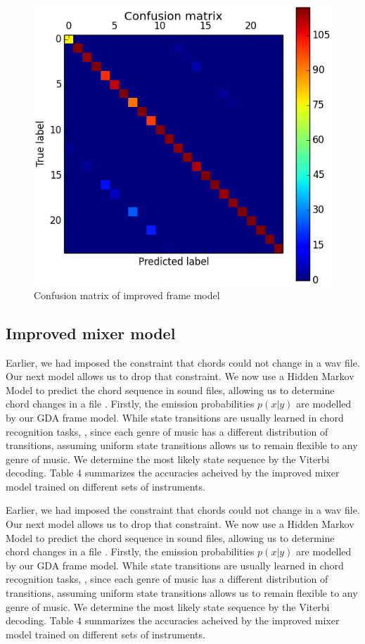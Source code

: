 \documentclass{article}
\begin{document}
\begin{figure}[ht]
\vskip 0.2in
\begin{center}
\centerline{\includegraphics[width=\columnwidth]{conf}}
\caption{Confusion matrix of improved frame model}
\label{icml-historical}
\end{center}
\vskip -0.2in
\end{figure}

\subsection{Improved mixer model}
Earlier, we had imposed the constraint that chords could not change in a wav
file. Our next model allows us to drop that constraint. We now use a Hidden
Markov Model to predict the chord sequence in sound files, allowing us to
determine chord changes in a file \cite{sheh}. Firstly, the emission
probabilities $p(x|y)$ are modelled by our GDA frame model. While state
transitions are usually learned in chord recognition tasks, \cite{lee}, since
each genre of music has a different distribution of transitions, assuming
uniform state transitions allows us to remain flexible to any genre of music. We
determine the most likely state sequence by the Viterbi decoding. Table 4
summarizes the accuracies acheived by the improved mixer model trained on
different sets of instruments.

Earlier, we had imposed the constraint that chords could not change in a wav
file. Our next model allows us to drop that constraint. We now use a Hidden
Markov Model to predict the chord sequence in sound files, allowing us to
determine chord changes in a file \cite{lee}. Firstly, the emission
probabilities $p(x|y)$ are modelled by our GDA frame model. While state
transitions are usually learned in chord recognition tasks, \cite{lee}, since
each genre of music has a different distribution of transitions, assuming
uniform state transitions allows us to remain flexible to any genre of music. We
determine the most likely state sequence by the Viterbi decoding. Table 4
summarizes the accuracies acheived by the improved mixer model trained on
different sets of instruments.
\end{document}
